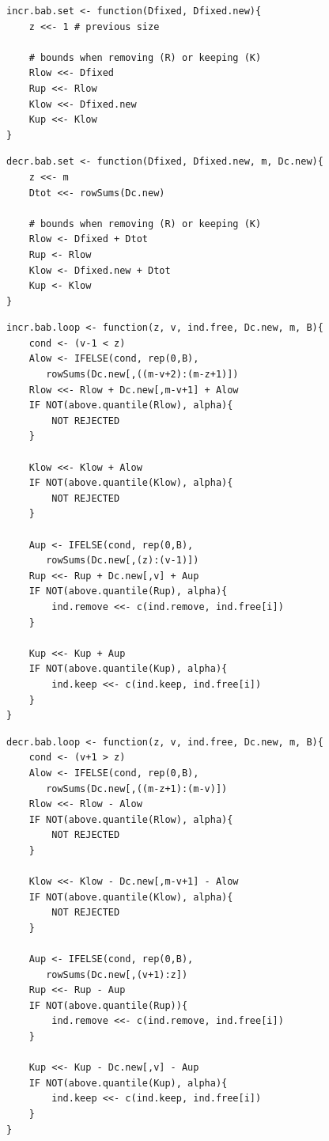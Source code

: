 \documentclass[11pt,a4paper,openright,twoside]{article}
\begin{document}
\begin{lstlisting}
incr.bab.set <- function(Dfixed, Dfixed.new){
	z <<- 1 # previous size

	# bounds when removing (R) or keeping (K)
	Rlow <<- Dfixed
	Rup <<- Rlow
	Klow <<- Dfixed.new
	Kup <<- Klow
}
\end{lstlisting}


\begin{lstlisting}
decr.bab.set <- function(Dfixed, Dfixed.new, m, Dc.new){
	z <<- m
	Dtot <<- rowSums(Dc.new)

	# bounds when removing (R) or keeping (K)
	Rlow <- Dfixed + Dtot
	Rup <- Rlow
	Klow <- Dfixed.new + Dtot
	Kup <- Klow
}
\end{lstlisting}

\begin{lstlisting}
incr.bab.loop <- function(z, v, ind.free, Dc.new, m, B){
	cond <- (v-1 < z)
	Alow <- IFELSE(cond, rep(0,B),
	   rowSums(Dc.new[,((m-v+2):(m-z+1)])
	Rlow <<- Rlow + Dc.new[,m-v+1] + Alow
	IF NOT(above.quantile(Rlow), alpha){
		NOT REJECTED
	}

	Klow <<- Klow + Alow
	IF NOT(above.quantile(Klow), alpha){
		NOT REJECTED
	}

	Aup <- IFELSE(cond, rep(0,B),
	   rowSums(Dc.new[,(z):(v-1)])
	Rup <<- Rup + Dc.new[,v] + Aup
	IF NOT(above.quantile(Rup), alpha){
		ind.remove <<- c(ind.remove, ind.free[i])
	}

	Kup <<- Kup + Aup
	IF NOT(above.quantile(Kup), alpha){
		ind.keep <<- c(ind.keep, ind.free[i])
	}
}
\end{lstlisting}

\begin{lstlisting}
decr.bab.loop <- function(z, v, ind.free, Dc.new, m, B){
	cond <- (v+1 > z)
	Alow <- IFELSE(cond, rep(0,B),
	   rowSums(Dc.new[,((m-z+1):(m-v)])
	Rlow <<- Rlow - Alow
	IF NOT(above.quantile(Rlow), alpha){
		NOT REJECTED
	}

	Klow <<- Klow - Dc.new[,m-v+1] - Alow 
	IF NOT(above.quantile(Klow), alpha){
		NOT REJECTED
	}

	Aup <- IFELSE(cond, rep(0,B),
	   rowSums(Dc.new[,(v+1):z])
	Rup <<- Rup - Aup
	IF NOT(above.quantile(Rup)){
		ind.remove <<- c(ind.remove, ind.free[i])
	}

	Kup <<- Kup - Dc.new[,v] - Aup
	IF NOT(above.quantile(Kup), alpha){
		ind.keep <<- c(ind.keep, ind.free[i])
	}
}
\end{lstlisting}
\end{document}
